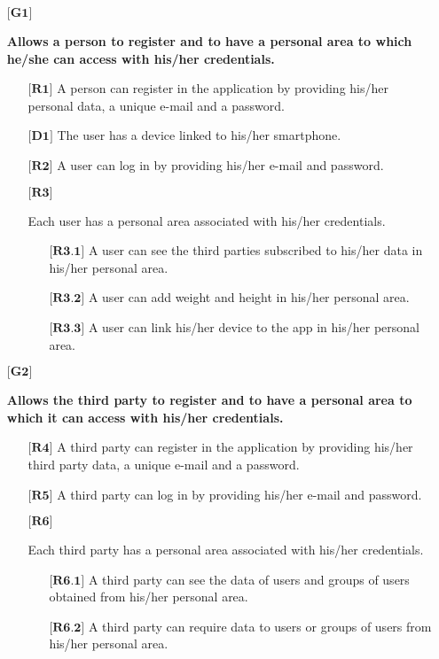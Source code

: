 \vspace{0.3cm}

\begin{itemize}

	\item[${\textbf{[G1]}}$] {\textbf{Allows a person to register and to have a personal area to which he/she can access with his/her credentials.}
		\begin{itemize}
			\item[$\textbf{[R1]}$] {A person can register in the application by providing his/her personal data, a unique e-mail and a password.}
			\item[$\textbf{[D1]}$] {The user has a device linked to his/her smartphone.}
			\item[$\textbf{[R2]}$] {A user can log in by providing his/her e-mail and password.}
			\item[$\textbf{[R3]}$] {Each user has a personal area associated with his/her credentials.
				\begin{itemize}
					\item[$\textbf{[R3.1]}$] {A user can see the third parties subscribed to his/her data in his/her personal area.}
					\item[$\textbf{[R3.2]}$] {A user can add weight and height in his/her personal area.}
					\item[$\textbf{[R3.3]}$] {A user can link his/her device to the app in his/her personal area.}
				\end{itemize}}
		\end{itemize}}


	\item[${\textbf{[G2]}}$] {\textbf{Allows the third party to register and to have a personal area to which it can access with his/her credentials.}
		\begin{itemize}
			\item[$\textbf{[R4]}$] {A third party can register in the application by providing his/her third party data, a unique e-mail and a password.}
			\item[$\textbf{[R5]}$] {A third party can log in by providing his/her e-mail and password.}
			\item[$\textbf{[R6]}$] {Each third party has a personal area associated with his/her credentials.
				\begin{itemize}
					\item[$\textbf{[R6.1]}$] {A third party can see the data of users and groups of users obtained from his/her personal area.}
					\item[$\textbf{[R6.2]}$] {A third party can require data to users or groups of users from his/her personal area.}
				\end {itemize}}
		\end{itemize}}



\end{itemize}
